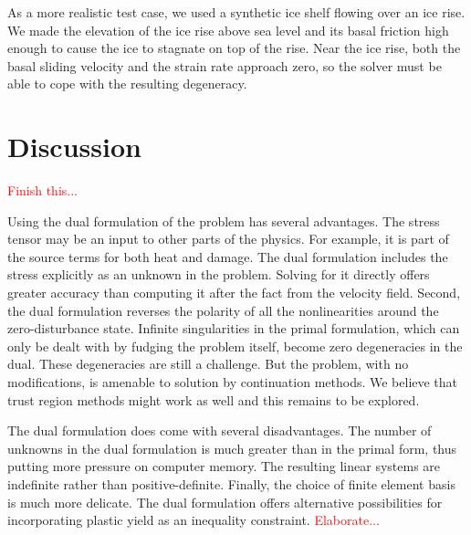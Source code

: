 \documentclass{article}
\theoremstyle{definition}
\theoremstyle{plain}
\begin{document}
As a more realistic test case, we used a synthetic ice shelf flowing over an ice rise.
We made the elevation of the ice rise above sea level and its basal friction high enough to cause the ice to stagnate on top of the rise.
Near the ice rise, both the basal sliding velocity and the strain rate approach zero, so the solver must be able to cope with the resulting degeneracy.


\section{Discussion}

\textcolor{red}{Finish this...}

Using the dual formulation of the problem has several advantages.
The stress tensor may be an input to other parts of the physics.
For example, it is part of the source terms for both heat and damage.
The dual formulation includes the stress explicitly as an unknown in the problem.
Solving for it directly offers greater accuracy than computing it after the fact from the velocity field.
Second, the dual formulation reverses the polarity of all the nonlinearities around the zero-disturbance state.
Infinite singularities in the primal formulation, which can only be dealt with by fudging the problem itself, become zero degeneracies in the dual.
These degeneracies are still a challenge.
But the problem, with no modifications, is amenable to solution by continuation methods.
We believe that trust region methods might work as well and this remains to be explored.

The dual formulation does come with several disadvantages.
The number of unknowns in the dual formulation is much greater than in the primal form, thus putting more pressure on computer memory.
The resulting linear systems are indefinite rather than positive-definite.
Finally, the choice of finite element basis is much more delicate.
The dual formulation offers alternative possibilities for incorporating plastic yield as an inequality constraint.
\textcolor{red}{Elaborate...}



\pagebreak



\end{document}
